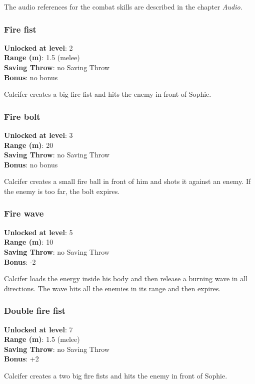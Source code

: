 The audio references for the combat skills are described in the chapter \textit{Audio}.

\subsubsection{Fire fist}
\textbf{Unlocked at level}: 2 \\
\textbf{Range (m)}: 1.5 (melee) \\
\textbf{Saving Throw}: no Saving Throw \\
\textbf{Bonus}: no bonus

Calcifer creates a big fire fist and hits the enemy in front of Sophie.

\subsubsection{Fire bolt}
\textbf{Unlocked at level}: 3 \\
\textbf{Range (m)}: 20 \\
\textbf{Saving Throw}: no Saving Throw \\
\textbf{Bonus}: no bonus

Calcifer creates a small fire ball in front of him and shots it against an enemy. If the enemy is too far, the bolt expires.

\subsubsection{Fire wave}
\textbf{Unlocked at level}: 5 \\
\textbf{Range (m)}: 10 \\
\textbf{Saving Throw}: no Saving Throw \\
\textbf{Bonus}: -2

Calcifer loads the energy inside his body and then release a burning wave in all directions. The wave hits all the enemies in its range and then expires.

\subsubsection{Double fire fist}
\textbf{Unlocked at level}: 7 \\
\textbf{Range (m)}: 1.5 (melee) \\
\textbf{Saving Throw}: no Saving Throw \\
\textbf{Bonus}: +2

Calcifer creates a two big fire fists and hits the enemy in front of Sophie.

